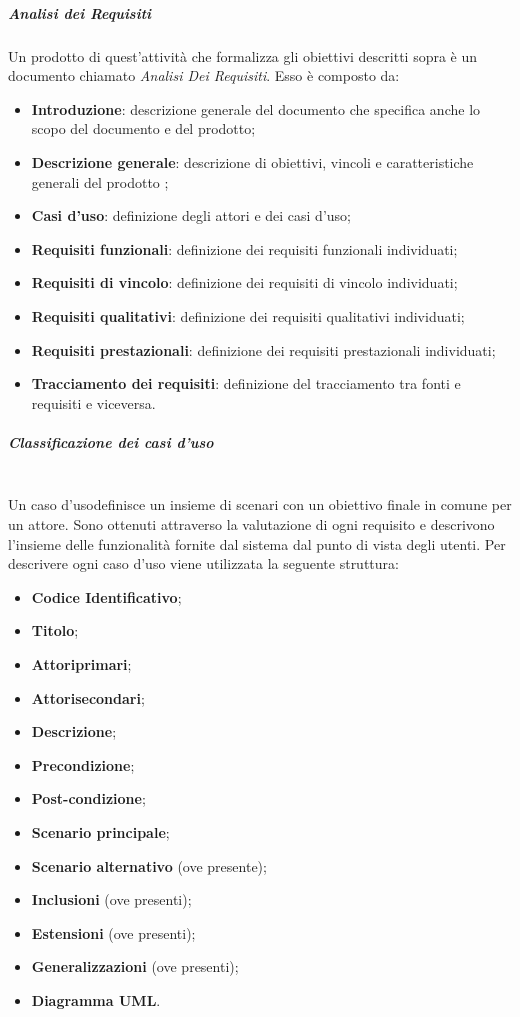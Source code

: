 		\subparagraph*{Analisi dei Requisiti}
		Un prodotto di quest'attività che formalizza gli obiettivi descritti sopra è un documento chiamato \textit{Analisi Dei Requisiti}. Esso è composto da:
		\begin{itemize}
			\item \textbf{Introduzione}: descrizione generale del documento che specifica anche lo scopo del documento e del prodotto\glo;
			\item \textbf{Descrizione generale}: descrizione di obiettivi, vincoli e caratteristiche generali del prodotto ;
			\item \textbf{Casi d'uso}: definizione degli attori e dei casi d'uso;
			\item \textbf{Requisiti funzionali}: definizione dei requisiti funzionali individuati;
			\item \textbf{Requisiti di vincolo}: definizione dei requisiti di vincolo individuati;
			\item \textbf{Requisiti qualitativi}: definizione dei requisiti qualitativi individuati;
			\item \textbf{Requisiti prestazionali}: definizione dei requisiti prestazionali individuati;
			\item \textbf{Tracciamento dei requisiti}: definizione del tracciamento tra fonti e requisiti e viceversa.
		\end{itemize}
		\subparagraph*{Classificazione dei casi d'uso}\mbox{}\\ [1mm]
		Un caso d'uso\glosp definisce un insieme di scenari con un obiettivo finale in comune per un attore\glo. Sono ottenuti attraverso la valutazione di ogni requisito e descrivono l'insieme delle funzionalità fornite dal sistema dal punto di vista degli utenti.
		Per descrivere ogni caso d'uso viene utilizzata la seguente struttura:
		\begin{itemize}
			\item \textbf{Codice Identificativo};
			\item \textbf{Titolo};
			\item \textbf{Attori}\glosp \textbf{primari};
			\item \textbf{Attori}\glosp \textbf{secondari};
			\item \textbf{Descrizione};
			\item \textbf{Precondizione};
			\item \textbf{Post-condizione};
			\item \textbf{Scenario principale};
			\item \textbf{Scenario alternativo} (ove presente);
			\item \textbf{Inclusioni} (ove presenti);
			\item \textbf{Estensioni} (ove presenti);
			\item \textbf{Generalizzazioni} (ove presenti);
			\item \textbf{Diagramma UML}.	
		\end{itemize}
